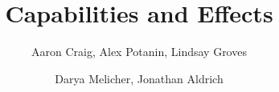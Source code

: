 \documentclass[sigplan,10pt,review]{acmart}\settopmatter{printfolios=true,printccs=false,printacmref=false}
\begin{document}
\title[Capabilities and Effects]{Capabilities and Effects}


\author{Aaron Craig, Alex Potanin, Lindsay Groves}

\author{Darya Melicher, Jonathan Aldrich}

\end{document}
